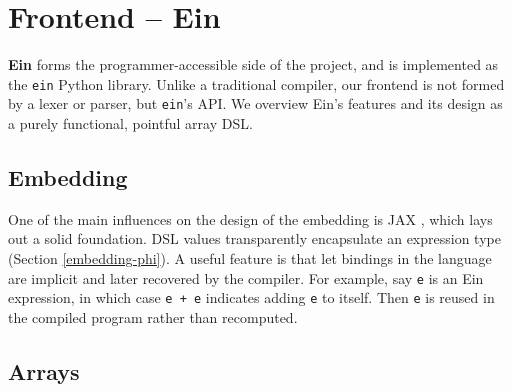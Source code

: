 \needspace{15em}
\section{Frontend -- Ein}
\label{ein-dsl}

\textbf{Ein} forms the programmer-accessible side of the project, and is implemented as the \texttt{ein} Python library. Unlike a traditional compiler, our frontend is not formed by a lexer or parser, but \texttt{ein}'s API. We overview Ein's features and its design as a purely functional, pointful array DSL.

\subsection{Embedding}

One of the main influences on the design of the embedding is JAX \cite{frostig2018compiling}, which lays out a solid foundation.
DSL values transparently encapsulate an expression type (Section \ref{embedding-phi}).
A useful feature is that let bindings in the language are implicit and later recovered by the compiler.
For example, say \texttt{e} is an Ein expression, in which case \texttt{e + e} indicates adding \texttt{e} to itself. 
Then \texttt{e} is reused in the compiled program rather than recomputed.

\subsection{Arrays}

